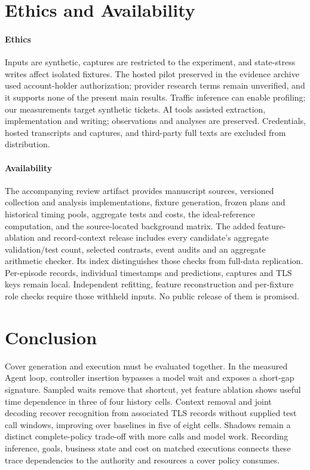 \section{Ethics and Availability}\label{sec:validity}
\paragraph{Ethics}
Inputs are synthetic, captures are restricted to the experiment, and state-stress writes affect isolated fixtures. The hosted pilot preserved in the evidence archive used account-holder authorization; provider research terms remain unverified, and it supports none of the present main results. Traffic inference can enable profiling; our measurements target synthetic tickets. AI tools assisted extraction, implementation and writing; observations and analyses are preserved. Credentials, hosted transcripts and captures, and third-party full texts are excluded from distribution.

\paragraph{Availability}
The accompanying review artifact provides manuscript sources, versioned collection and analysis implementations, fixture generation, frozen plans and historical timing pools, aggregate tests and costs, the ideal-reference computation, and the source-located background matrix. The added feature-ablation and record-context release includes every candidate's aggregate validation/test count, selected contrasts, event audits and an aggregate arithmetic checker. Its index distinguishes those checks from full-data replication. Per-episode records, individual timestamps and predictions, captures and TLS keys remain local. Independent refitting, feature reconstruction and per-fixture role checks require those withheld inputs. No public release of them is promised.

\section{Conclusion}
Cover generation and execution must be evaluated together. In the measured Agent loop, controller insertion bypasses a model wait and exposes a short-gap signature. Sampled waits remove that shortcut, yet feature ablation shows useful time dependence in three of four history cells. Context removal and joint decoding recover recognition from associated TLS records without supplied test call windows, improving over baselines in five of eight cells. Shadows remain a distinct complete-policy trade-off with more calls and model work. Recording inference, goals, business state and cost on matched executions connects these trace dependencies to the authority and resources a cover policy consumes.
